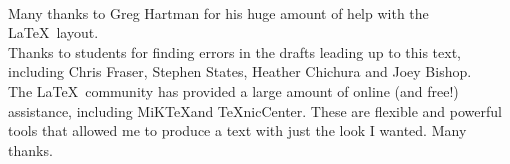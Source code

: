 \Huge
{}\\

\vspace{1in}
\normalsize

Many thanks to Greg Hartman for his huge amount of help with the \LaTeX\ layout.\\

Thanks to students for finding errors in the drafts leading up to this text, including Chris Fraser, Stephen States, Heather Chichura and Joey Bishop.\\

The \LaTeX\ community has provided a large amount of online (and free!) assistance, including MiK\TeX and \TeX nicCenter.  These are flexible and powerful tools that allowed me to produce a text with just the look I wanted.  Many thanks.

%
